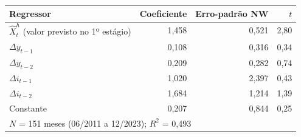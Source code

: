 \begin{tabular}{lrrr}
\toprule
Regressor & Coeficiente & Erro-padrão NW & $t$ \\
\midrule
$\widehat{X}^h_t$ (valor previsto no 1º estágio) & 1{,}458 & 0{,}521 & 2{,}80 \\
$\Delta y_{t-1}$ & 0{,}108 & 0{,}316 & 0{,}34 \\
$\Delta y_{t-2}$ & 0{,}209 & 0{,}282 & 0{,}74 \\
$\Delta i_{t-1}$ & 1{,}020 & 2{,}397 & 0{,}43 \\
$\Delta i_{t-2}$ & 1{,}684 & 1{,}214 & 1{,}39 \\
Constante & 0{,}207 & 0{,}844 & 0{,}25 \\
\midrule
\multicolumn{4}{l}{$N$ = 151 meses (06/2011 a 12/2023); $R^2$ = 0{,}493} \\
\bottomrule
\end{tabular}
